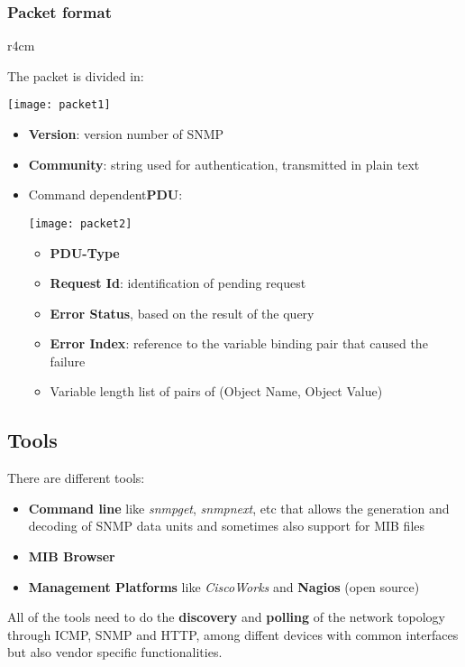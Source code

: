 \subsubsection{Packet format}
\begin{wraptable}[10]{r}{4cm}
	\vspace{5.7cm}
\end{wraptable}
The packet is divided in:
\begin{center}
	\texttt{[image: packet1]}
\end{center}
\begin{itemize}
	\item \textbf{Version}: version number of SNMP
	\item \textbf{Community}: string used for authentication, transmitted in plain text
	\item Command dependent\textbf{PDU}:
	\begin{center}
		\texttt{[image: packet2]}
	\end{center}
	\begin{itemize}
		\item \textbf{PDU-Type}
		\item \textbf{Request Id}: identification of pending request
		\item \textbf{Error Status}, based on the result of the query
		\item \textbf{Error Index}: reference to the variable binding pair that caused the failure
		\item Variable length list of pairs of (Object Name, Object Value)
	\end{itemize}
\end{itemize}

\subsection{Tools}
There are different tools:
\begin{itemize}
	\item \textbf{Command line} like \textit{snmpget}, \textit{snmpnext}, etc that allows the generation and decoding of SNMP data units and sometimes also support for MIB files
	\item \textbf{MIB Browser}
	\item \textbf{Management Platforms} like \textit{CiscoWorks} and \textbf{Nagios} (open source)
\end{itemize}
All of the tools need to do the \textbf{discovery} and \textbf{polling} of the network topology through ICMP, SNMP and HTTP, among diffent devices with common interfaces but also vendor specific functionalities.

